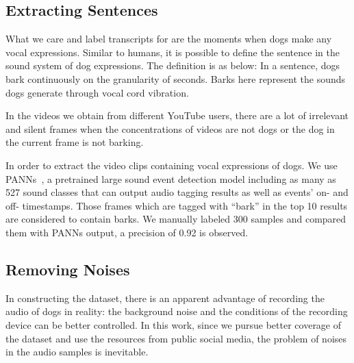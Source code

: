  \subsection{Extracting Sentences}
 \label{extractingsentences}
What we care and label transcripts for are the moments when dogs make any vocal expressions. Similar to humans, it is possible to define the sentence in the sound system of dog expressions. 
The definition is as below: In a sentence, dogs bark continuously on the granularity of seconds. Barks here represent the sounds dogs generate through vocal cord vibration.

In the videos we obtain from different YouTube users, there are a lot of irrelevant and silent frames when the concentrations of videos are not dogs or the dog in the current frame is not barking. 

In order to extract the video clips containing vocal expressions of dogs.
We use PANNs~\cite{kong2020panns}, a pretrained large sound event detection model including as many as 527 sound classes that can output audio tagging results as well as events’ on- and off- timestamps. Those frames which are tagged with ``bark'' in the top 10 results are considered to contain barks. We manually labeled 300 samples and compared them with PANNs output, a precision of 0.92 is observed.

 \subsection{Removing Noises}
In constructing the dataset,  there is an apparent advantage of recording the audio of dogs in reality: the background noise and the conditions of the recording device can be better controlled. In this work, since we pursue better coverage of the dataset and 
use the resources from public social media, the problem of noises in the audio samples is inevitable. 

